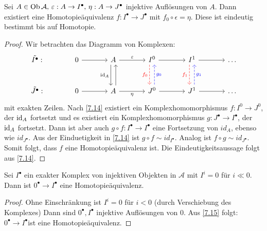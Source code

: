 \begin{fo}\label{7.15}
	Sei $A \in \text{Ob}\,\mathcal{A}, \,\varepsilon: A \to I^{\bullet}, \,\eta: A \to J^{\bullet}$ injektive Auflösungen von $A$. Dann existiert eine Homotopieäquivalenz $f:I^{\bullet} \to J^{\bullet} $ mit $ f_0 \circ \epsilon = \eta$. Diese ist eindeutig bestimmt bis auf Homotopie.
\end{fo}
\begin{proof}
	Wir betrachten das Diagramm von Komplexen: \\
	$$\begin{tikzcd}[column sep = large, row sep = large]
	\tilde{I^{\bullet}}: &0 \arrow{r} & A \arrow[xshift= -0.8 ex, swap]{d}{\id_A} \arrow{r}{\epsilon}& I^0 \arrow[dashed,red, swap, xshift= -0.8 ex]{d}{f_0}\arrow{r} & I^1 \arrow[dashed,red,xshift= -0.8 ex, swap ]{d}{f_1} \arrow{r} & \ldots\\
	\tilde{J^{\bullet}}:& 0 \arrow{r} & A \arrow[xshift=0.8 ex]{u}\arrow[swap]{r}{\eta} & J^0 \arrow[dashed, blue, xshift = 0.8 ex, swap]{u}{g_0} \arrow[swap]{r} & J^1 \arrow[dashed, blue, swap, xshift=0.8 ex]{u}{g_1} \arrow{r} & \ldots
	\end{tikzcd}$$
	mit exakten Zeilen. Nach \ref{7.14} existiert ein Komplexhomomorphismus $ f: I^{0} \to J^{0} $, der $\operatorname{id}_A $ fortsetzt und es existiert ein Komplexhomomorphismus $g: J^{\bullet} \to I^{\bullet}$, der $\operatorname{id}_A $ fortsetzt. Dann ist aber auch $g \circ f: I^{\bullet} \to I^{\bullet} $ eine Fortsetzung von $id_A$, ebenso wie $id_{J^{\bullet}}$. Aus der Einduetigkeit in \ref{7.14} ist $ g \circ f \sim id_{I^{\bullet}}.$ Analog ist $f \circ g \sim id_{J^{\bullet}}.$ Somit folgt, dass $f$ eine Homotopieäquivalenz ist. Die Eindeutigkeitsaussage folgt aus \ref{7.14}.
\end{proof}
\begin{fo}
	Sei $I^{\bullet} $ ein exakter Komplex von injektiven Objekten in $\mathcal{A} $ mit $ I^i = 0 $ für $ i \ll 0$. Dann ist $0^{\bullet} \to I^{\bullet} $ eine Homotopieäquivalenz. 
\end{fo}
\begin{proof}
	Ohne Einschränkung ist $ I^i = 0 $ für $ i < 0 $ (durch Verschiebung des Komplexes) Dann sind $ 0^{\bullet}, I^{\bullet} $ injektive Auflösungen von 0. Aus \ref{7.15} folgt: $0^{\bullet} \to I^{\bullet} $ist eine Homotopieäquivalenz.
\end{proof} 